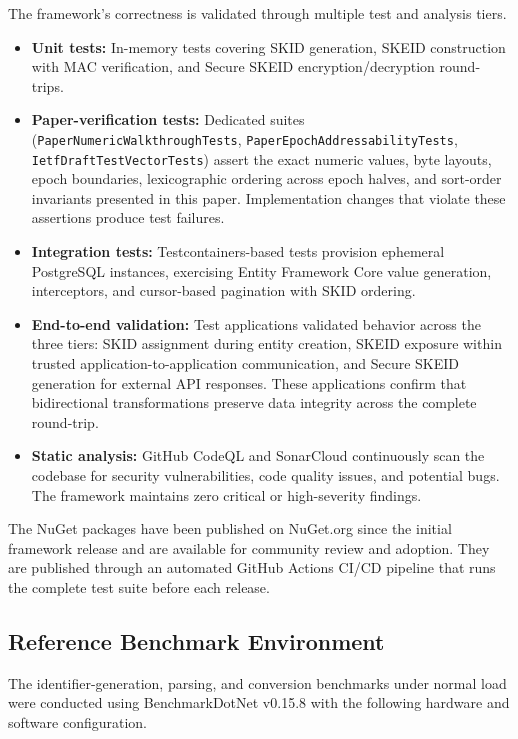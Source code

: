 \documentclass[a4paper,fleqn]{cas-sc}
\providecommand{\tightlist}{%
  \setlength{\itemsep}{0pt}\setlength{\parskip}{0pt}}
\begin{document}
The framework's correctness is validated through multiple test and
analysis tiers.

\begin{itemize}
\tightlist
\item
  \textbf{Unit tests:} In-memory tests covering SKID generation, SKEID
  construction with MAC verification, and Secure SKEID
  encryption/decryption round-trips.
\item
  \textbf{Paper-verification tests:} Dedicated suites
  (\texttt{PaperNumericWalkthroughTests},
  \texttt{PaperEpochAddressabilityTests},
  \texttt{IetfDraftTestVectorTests}) assert the exact numeric values,
  byte layouts, epoch boundaries, lexicographic ordering across epoch
  halves, and sort-order invariants presented in this paper.
  Implementation changes that violate these assertions produce test
  failures.
\item
  \textbf{Integration tests:} Testcontainers-based tests provision
  ephemeral PostgreSQL instances, exercising Entity Framework Core value
  generation, interceptors, and cursor-based pagination with SKID
  ordering.
\item
  \textbf{End-to-end validation:} Test applications validated behavior
  across the three tiers: SKID assignment during entity creation, SKEID
  exposure within trusted application-to-application communication, and
  Secure SKEID generation for external API responses. These applications
  confirm that bidirectional transformations preserve data integrity
  across the complete round-trip.
\item
  \textbf{Static analysis:} GitHub CodeQL and SonarCloud continuously
  scan the codebase for security vulnerabilities, code quality issues,
  and potential bugs. The framework maintains zero critical or
  high-severity findings.
\end{itemize}

The NuGet packages have been published on NuGet.org since the initial
framework release and are available for community review and adoption.
They are published through an automated GitHub Actions CI/CD pipeline
that runs the complete test suite before each release.

\subsection{Reference Benchmark
Environment}\label{reference-benchmark-environment}

The identifier-generation, parsing, and conversion benchmarks under
normal load were conducted using BenchmarkDotNet \citep{benchmarkdotnet}
v0.15.8 with the following hardware and software configuration.
\end{document}
